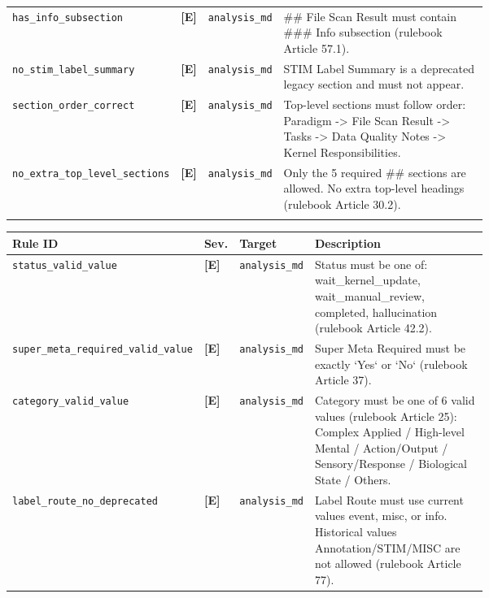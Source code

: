 \begin{tcolorbox}
\begin{tabular}{@{}p{0.22\linewidth}ll p{0.46\linewidth}@{}}
\addlinespace[1pt]
\texttt{has\_\allowbreak{}info\_\allowbreak{}subsection} & \textbf{[E]} & \texttt{analysis\_md} & \#\# File Scan Result must contain \#\#\# Info subsection (rulebook Article 57.1). \\
\addlinespace[1pt]
\texttt{no\_\allowbreak{}stim\_\allowbreak{}label\_\allowbreak{}summary} & \textbf{[E]} & \texttt{analysis\_md} & STIM Label Summary is a deprecated legacy section and must not appear. \\
\addlinespace[1pt]
\texttt{section\_\allowbreak{}order\_\allowbreak{}correct} & \textbf{[E]} & \texttt{analysis\_md} & Top-level sections must follow order: Paradigm -> File Scan Result -> Tasks -> Data Quality Notes -> Kernel Responsibilities. \\
\addlinespace[1pt]
\texttt{no\_\allowbreak{}extra\_\allowbreak{}top\_\allowbreak{}level\_\allowbreak{}sections} & \textbf{[E]} & \texttt{analysis\_md} & Only the 5 required \#\# sections are allowed. No extra top-level headings (rulebook Article 30.2). \\
\addlinespace[1pt]
\bottomrule
\end{tabular}
\endgroup
\smallskip{}\par\smallskip
\begingroup\footnotesize
\begin{tabular}{@{}p{0.22\linewidth}ll p{0.46\linewidth}@{}}
\toprule
\textbf{Rule ID} & \textbf{Sev.} & \textbf{Target} & \textbf{Description} \\
\midrule
\texttt{status\_\allowbreak{}valid\_\allowbreak{}value} & \textbf{[E]} & \texttt{analysis\_md} & Status must be one of: wait\_kernel\_update, wait\_manual\_review, completed, hallucination (rulebook Article 42.2). \\
\addlinespace[1pt]
\texttt{super\_\allowbreak{}meta\_\allowbreak{}required\_\allowbreak{}valid\_\allowbreak{}value} & \textbf{[E]} & \texttt{analysis\_md} & Super Meta Required must be exactly `Yes` or `No` (rulebook Article 37). \\
\addlinespace[1pt]
\texttt{category\_\allowbreak{}valid\_\allowbreak{}value} & \textbf{[E]} & \texttt{analysis\_md} & Category must be one of 6 valid values (rulebook Article 25): Complex Applied / High-level Mental / Action/Output / Sensory/Response / Biological State / Others. \\
\addlinespace[1pt]
\texttt{label\_\allowbreak{}route\_\allowbreak{}no\_\allowbreak{}deprecated} & \textbf{[E]} & \texttt{analysis\_md} & Label Route must use current values event, misc, or info. Historical values Annotation/STIM/MISC are not allowed (rulebook Article 77). \\

\end{tabular}
\end{tcolorbox}
